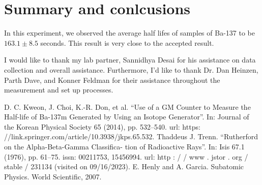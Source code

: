 \documentclass[10pt,letterpaper,onecolumn]{article}
\begin{document}
\section{Summary and conlcusions}

In this experiment, we observed the average half lifes of samples of Ba-137 to be 
$163.1 \pm 8.5$ seconds. This result is very close to the accepted result.

I would like to thank my lab partner, Sannidhya Desai for his assistance on data
collection and overall assistance. Furthermore, I'd like to thank Dr. Dan Heinzen,
Parth Dave, and Konner Feldman for their assistance throughout the measurement and 
set up processes.


\begin{thebibliography}{9}
\bibitem{}D. C. Kweon, J. Choi, K.-R. Don, et al. “Use of a GM Counter to Measure
the Half-life of Ba-137m Generated by Using an Isotope Generator”. In:
Journal of the Korean Physical Society 65 (2014), pp. 532–540. url: https:
//link.springer.com/article/10.3938/jkps.65.532.
\bibitem{}Thaddeus J. Trenn. “Rutherford on the Alpha-Beta-Gamma Classifica-
tion of Radioactive Rays”. In: Isis 67.1 (1976), pp. 61–75. issn: 00211753,
15456994. url: http : / / www . jstor . org / stable / 231134 (visited on
09/16/2023).
\bibitem{}E. Henly and A. Garcia. Subatomic Physics. World Scientific, 2007.
\end{thebibliography}
\end{document}
